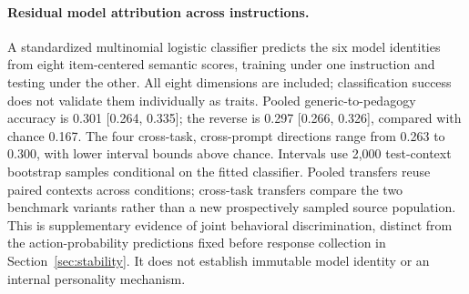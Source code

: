\paragraph{Residual model attribution across instructions.}
A standardized multinomial logistic classifier predicts the six model
identities from eight item-centered semantic scores, training under one
instruction and testing under the other. All eight dimensions are included;
classification success does not validate them individually as traits.
Pooled generic-to-pedagogy accuracy is 0.301 [0.264, 0.335]; the reverse is
0.297 [0.266, 0.326], compared with chance 0.167. The four cross-task,
cross-prompt directions range from 0.263 to 0.300, with lower interval bounds
above chance. Intervals use 2,000 test-context bootstrap samples conditional
on the fitted classifier. Pooled transfers reuse paired contexts across conditions;
cross-task transfers compare the two benchmark variants rather than a new
prospectively sampled source population. This is supplementary evidence of
joint behavioral discrimination, distinct from the action-probability
predictions fixed before response collection in Section~\ref{sec:stability}. It does not establish immutable
model identity or an internal personality mechanism.
